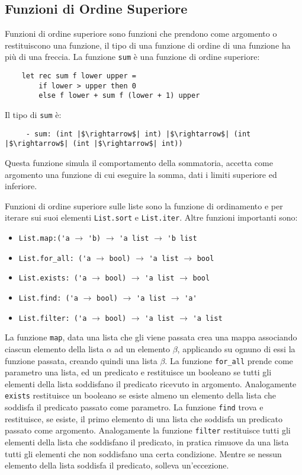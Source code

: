 \documentclass{article}
\numberwithin{equation}{subsection}
\begin{document}
\subsection{Funzioni di Ordine Superiore}

Funzioni di ordine superiore sono funzioni che prendono come argomento o restituiscono una funzione, il tipo di una funzione di ordine di una funzione ha più di una freccia. La funzione \verb|sum| è una funzione di ordine superiore:
\begin{verbatim}
    let rec sum f lower upper =
        if lower > upper then 0
        else f lower + sum f (lower + 1) upper
\end{verbatim}
Il tipo di \verb|sum| è:
\begin{verbatim}
     - sum: (int |$\rightarrow$| int) |$\rightarrow$| (int |$\rightarrow$| (int |$\rightarrow$| int)) 
\end{verbatim}
Questa funzione simula il comportamento della sommatoria, accetta come argomento una funzione di cui eseguire la somma, dati i limiti superiore ed inferiore. 

Funzioni di ordine superiore sulle liste sono la funzione di ordinamento e per iterare sui suoi elementi \verb|List.sort| e \verb|List.iter|. 
Altre funzioni importanti sono:
\begin{itemize}
    \item \verb|List.map:('a| $\rightarrow$ \verb|'b)| $\rightarrow$ \verb|'a list| $\rightarrow$ \verb|'b list|
    \item \verb|List.for_all: ('a| $\rightarrow$ \verb|bool)| $\rightarrow$ \verb|'a list| $\rightarrow$ \verb|bool|
    \item \verb|List.exists: ('a| $\rightarrow$ \verb|bool)| $\rightarrow$ \verb|'a list| $\rightarrow$ \verb|bool|
    \item \verb|List.find: ('a| $\rightarrow$ \verb|bool)| $\rightarrow$ \verb|'a list| $\rightarrow$ \verb|'a'|
    \item \verb|List.filter: ('a| $\rightarrow$ \verb|bool)| $\rightarrow$ \verb|'a list| $\rightarrow$ \verb|'a list|
\end{itemize}

La funzione \verb|map|, data una lista che gli viene passata crea una mappa associando ciascun elemento della lista $\alpha$ ad un elemento $\beta$, applicando su ognuno di essi la funzione passata, creando quindi una lista $\beta$. 
La funzione \verb|for_all| prende come parametro una lista, ed un predicato e restituisce un booleano se tutti gli elementi della lista soddisfano il predicato ricevuto in argomento. 
Analogamente \verb|exists| restituisce un booleano se esiste almeno un elemento della lista che soddisfa il predicato passato come parametro. 
La funzione \verb|find| trova e restituisce, se esiste, il primo elemento di una lista che soddisfa un predicato passato come argomento. 
Analogamente la funzione \verb|filter| restituisce tutti gli elementi della lista che soddisfano il predicato, in pratica rimuove da una lista tutti gli elementi che non soddisfano una certa condizione. Mentre se nessun elemento della lista soddisfa il predicato, solleva un'eccezione. 
\end{document}
